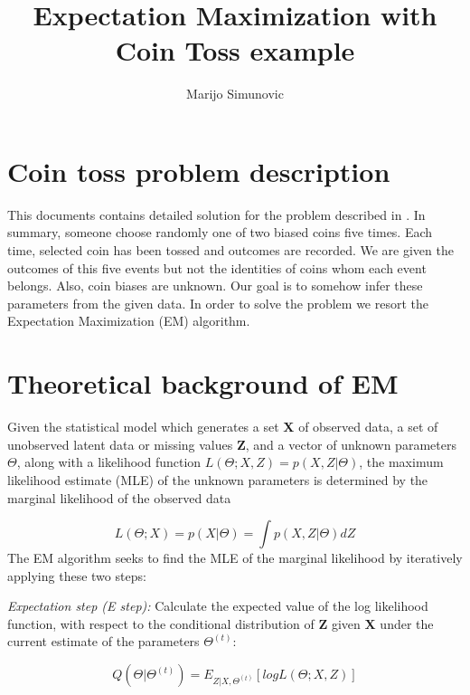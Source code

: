 \documentclass[11pt]{article}
\theoremstyle{plain}
\theoremstyle{definition}
\begin{document}
\title{Expectation Maximization with Coin Toss example}
\author{Marijo Simunovic}
\maketitle
\section{Coin toss problem description}
This documents contains detailed solution for the problem described in \cite{nature}. In summary, someone choose randomly one of two biased coins five times. Each time, selected coin has been tossed and outcomes are recorded. We are given the outcomes of this five events but not the identities of coins whom each event belongs. Also, coin biases are unknown. Our goal is to somehow infer these parameters from the given data. In order to solve the problem we resort the Expectation Maximization (EM) algorithm. 

\section{Theoretical background of EM}

Given the statistical model which generates a set \textbf{X} of observed data, a set of unobserved latent data or missing values \textbf{Z}, and a vector of unknown parameters \textbf{$\Theta$}, along with a likelihood function \boldmath$\textit{L}(\Theta;X,Z) = \textit{p}(X,Z|\Theta)$,
the maximum likelihood estimate (MLE) of the unknown parameters is determined by the marginal likelihood of the observed data

\boldmath
\begin{equation}
\textit{L}(\Theta;X)=\textit{p}(X|\Theta)=\int\textit{p}(X,Z|\Theta)\textit{d}Z
\end{equation}
The EM algorithm seeks to find the MLE of the marginal likelihood by iteratively applying these two steps:

\textit{Expectation step (E step):} Calculate the expected value of the log likelihood function, with respect to the conditional distribution of \textbf{Z} given \textbf{X} under the current estimate of the parameters $\Theta^{(t)}$:

\begin{equation}
Q(\Theta|\Theta^{(t)})=E_{Z|X,\Theta^{(t)}}[log\textit{L}(\Theta;X,Z)]    
\end{equation}
\end{document}
